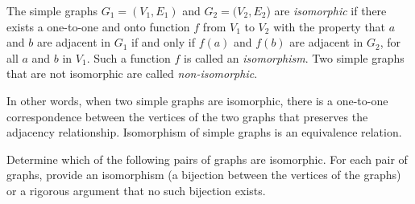 \documentclass[addpoints]{exam}
\begin{document}
\begin{questions}
  
\question  The simple graphs $G_1 = (V_1,E_1)$ and $G_2 = (V_2,E_2$) are \textit{isomorphic} if there exists a one-to-one and onto function $f$ from $V_1$ to $V_2$ with the property that $a$ and $b$ are adjacent in $G_1$ if and only if $f(a)$ and $f(b)$ are adjacent in $G_2$, for all $a$ and $b$ in $V_1$. Such a function $f$ is called an \textit{isomorphism}. Two simple graphs that are not isomorphic are called \textit{non-isomorphic}.

  In other words, when two simple graphs are isomorphic, there is a one-to-one correspondence between the vertices of the two graphs that preserves the adjacency relationship. Isomorphism of simple graphs is an equivalence relation.

  Determine which of the following pairs of graphs are isomorphic. For each pair of graphs, provide an isomorphism (a bijection between the vertices of the graphs) or a rigorous argument that no such bijection exists.


\end{questions}
\end{document}
